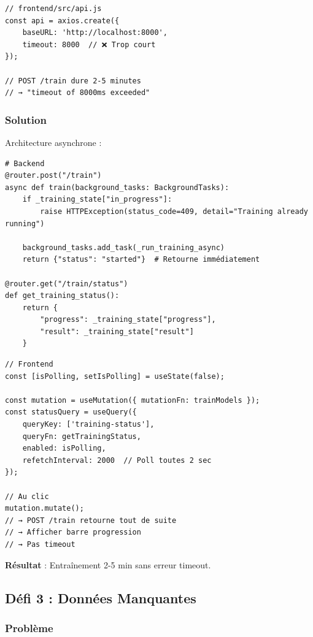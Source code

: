 \documentclass[12pt,a4paper,french]{article}
\begin{document}
\begin{lstlisting}
// frontend/src/api.js
const api = axios.create({
    baseURL: 'http://localhost:8000',
    timeout: 8000  // ❌ Trop court
});

// POST /train dure 2-5 minutes
// → "timeout of 8000ms exceeded"
\end{lstlisting}

\subsubsection{Solution}

Architecture asynchrone :

\begin{lstlisting}
# Backend
@router.post("/train")
async def train(background_tasks: BackgroundTasks):
    if _training_state["in_progress"]:
        raise HTTPException(status_code=409, detail="Training already running")
    
    background_tasks.add_task(_run_training_async)
    return {"status": "started"}  # Retourne immédiatement

@router.get("/train/status")
def get_training_status():
    return {
        "progress": _training_state["progress"],
        "result": _training_state["result"]
    }
\end{lstlisting}

\begin{lstlisting}
// Frontend
const [isPolling, setIsPolling] = useState(false);

const mutation = useMutation({ mutationFn: trainModels });
const statusQuery = useQuery({
    queryKey: ['training-status'],
    queryFn: getTrainingStatus,
    enabled: isPolling,
    refetchInterval: 2000  // Poll toutes 2 sec
});

// Au clic
mutation.mutate();
// → POST /train retourne tout de suite
// → Afficher barre progression
// → Pas timeout
\end{lstlisting}

\textbf{Résultat} : Entraînement 2-5 min sans erreur timeout.

\subsection{Défi 3 : Données Manquantes}

\subsubsection{Problème}
\end{document}
